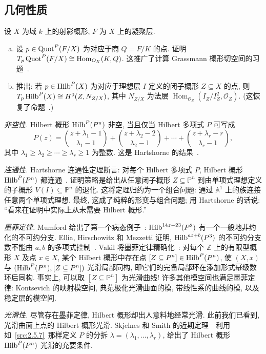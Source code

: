 \subsection{几何性质}\label{src:2.5.2-subsection}
\begin{exercise}[局部性质]\label{src:2.5.6}
设 $X$ 为域 $k$ 上的射影概形, $F$ 为 $X$ 上的凝聚层.
\begin{enumerate}[(a)]
\item 设 $p\in\operatorname{Quot}^P(F/X)$ 为对应于商 $Q=F/K$ 的点.
证明 $T_p\operatorname{Quot}^P(F/X)\cong\operatorname{Hom}_{O_X}(K,Q)$.
这推广了计算 Grassmann 概形切空间的习题~.
\item 推出: 若 $p\in\operatorname{Hilb}^P(X)$ 为对应于理想层 $I$ 定义的闭子概形 $Z\subseteq X$ 的点, 则
$T_p\operatorname{Hilb}^P(X)\cong H^0(Z,N_{Z/X})$, 
其中 $N_{Z/X}$ 为法层 $\operatorname{Hom}_{\mathcal O_Z}(I_Z/I_Z^2,\mathcal O_Z)$.
(这恢复了命题~.)
\end{enumerate}
\end{exercise}
\textit{非空性.} Hilbert 概形 $\operatorname{Hilb}^P(P^n)$ 非空, 当且仅当 Hilbert 多项式 $P$ 可写成
\begin{equation}\label{src:2.5.7}
P(z)=\binom{z+\lambda_1-1}{\lambda_1-1}
+\binom{z+\lambda_2-2}{\lambda_2-1}
+\cdots+\binom{z+\lambda_r-r}{\lambda_r-1},
\end{equation}
其中 $\lambda_1\geq\lambda_2\geq\cdots\geq\lambda_r\geq1$ 为整数.
这是 Hartshorne 的结果~\cite[推论 $5.7$]{Har66b}.

\textit{连通性.} Hartshorne 连通性定理断言: 对每个 Hilbert 多项式 $P$, Hilbert 概形 $\operatorname{Hilb}^P(P^n)$ 都连通~\cite{Har66b}.
证明策略是给出从任意闭子概形 $Z\subseteq\mathbb P^n$ 到由单项式理想定义的子概形 $V(I)\subseteq\mathbb P^n$ 的退化.
这将定理归约为一个组合问题: 通过 $\mathbb A^1$ 上的族连接任意两个单项式理想.
最终, 这成了纯粹的形变与组合问题; 用 Hartshorne 的话说: ``看来在证明中实际上从未需要 Hilbert 概形.''

\textit{墨菲定律.} Mumford 给出了第一个病态例子~\cite{Mum62}: $\operatorname{Hilb}^{14z-23}(P^3)$ 有一个一般地非约化的不可约分支.
Ellia, Hirschowitz 和 Mezzetti 证明, $\operatorname{Hilb}^{az+b}(P^3)$ 的不可约分支数不能由 $a,b$ 的多项式控制~\cite{EHM92}.
Vakil 将墨菲定律精确化~\cite{Vak06}: 
对每个 $\mathbb Z$ 上的有限型概形 $X$ 及点 $x\in X$, 某个 Hilbert 概形中存在点
$[Z\subseteq P^n]\in\operatorname{Hilb}^P(P^n)$, 
使 $(X,x)$ 与 $(\operatorname{Hilb}^P(P^n),[Z\subseteq P^n])$ 光滑局部同构, 即它们的完备局部环在添加形式幂级数环后同构.
事实上, 可以取 $[Z\subseteq\mathbb P^n]$ 为光滑曲线!
许多其他模空间也满足墨菲定律: Kontsevich 的映射模空间, 典范极化光滑曲面的模, 带线性系的曲线的模, 以及稳定层的模空间.

\textit{光滑性.} 尽管存在墨菲定律, Hilbert 概形却出人意料地经常光滑.
此前我们已看到, 光滑曲面上点的 Hilbert 概形光滑.
Skjelnes 和 Smith 的近期定理~\cite{SS20}~利用如~\eqref{src:2.5.7}~那样定义 $P$ 的分拆 $\lambda=(\lambda_1,\ldots,\lambda_r)$, 给出了 Hilbert 概形 $\operatorname{Hilb}^P(P^n)$ 光滑的充要条件.
